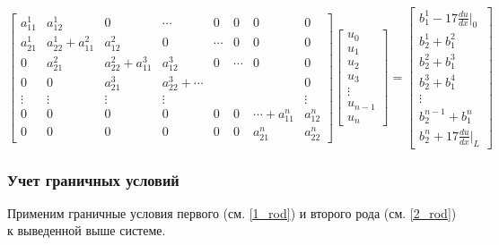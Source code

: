 $$ \begin{bmatrix}
a_{11}^1     &   a_{12}^1         &   0 & \cdots & 0 & 0 & 0  & 0\\
a_{21}^1     &    a_{22}^1+a_{11}^2 & a_{12}^2  & 0 & \cdots & 0 & 0  & 0\\
0     &    a_{21}^2 & a_{22}^2+a_{11}^3  &  a_{12}^3  & 0 & \cdots & 0  & 0\\
0     &    0  & a_{21}^3  & a_{22}^3+ \cdots  &  & &   & 0\\
\vdots & \vdots & \vdots & \vdots &  &  &   & \vdots\\
0 & 0 & 0 & 0 &  0 & 0 & \cdots+a_{11}^n  & a_{12}^n\\
0 & 0 & 0 & 0 &  0 & 0 & a_{21}^n  & a_{22}^n
\end{bmatrix}
\begin{bmatrix}
u_0 \\
u_1 \\
u_2\\
u_3\\
\vdots\\
u_{n-1}\\
u_n
\end{bmatrix} =
\begin{bmatrix}
b_1^1   -17  \frac{du}{dx}|_0 \\
b_2^1+b_1^2\\
b_2^2+b_1^3\\
b_2^3+b_1^4\\
\vdots\\
b_2^{n-1}+b_1^n\\
b_2^n   +17  \frac{du}{dx}|_L
\end{bmatrix}
$$

\subsubsection{Учет граничных условий}

Применим граничные условия первого (см. \ref{1_rod}) и второго рода (см. \ref{2_rod}) к выведенной выше системе.

